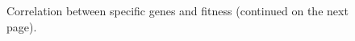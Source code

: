 \begin{figure}[H]
    \qquad
  \captionsetup{justification=centering}
    \caption{Correlation between specific genes and fitness (continued on the next page).}
    \label{fig:genescorr}
\end{figure}
